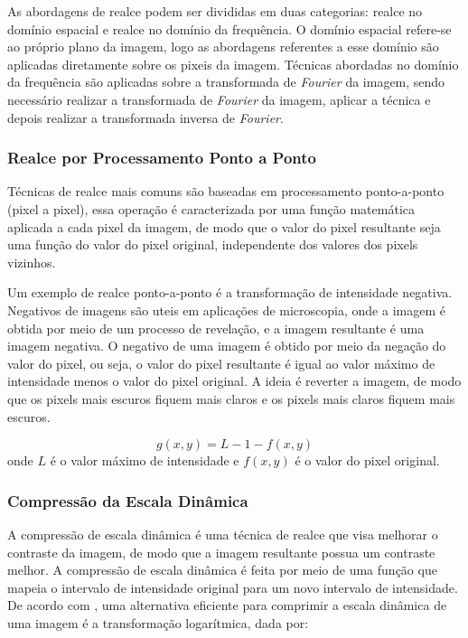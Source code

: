 \documentclass[conference]{IEEEtran}
\begin{document}
As abordagens de realce podem ser divididas em duas categorias: realce no domínio espacial e realce no domínio da 
frequência. O domínio espacial refere-se ao próprio plano da imagem, logo as abordagens referentes a esse domínio 
são aplicadas diretamente sobre os pixeis da imagem. Técnicas abordadas no domínio da frequência são aplicadas 
sobre a transformada de \emph{Fourier} da imagem, sendo necessário realizar a transformada de \emph{Fourier} da 
imagem, aplicar a técnica e depois realizar a transformada inversa de \emph{Fourier}. 

\subsubsection{Realce por Processamento Ponto a Ponto}

Técnicas de realce mais comuns são baseadas em processamento ponto-a-ponto (pixel a pixel), essa operação é 
caracterizada por uma função matemática aplicada a cada pixel da imagem, de modo que o valor do pixel resultante 
seja uma função do valor do pixel original, independente dos valores dos pixels vizinhos. 

Um exemplo de realce ponto-a-ponto é a transformação de intensidade negativa. Negativos de imagens são uteis em 
aplicações de microscopia, onde a imagem é obtida por meio de um processo de revelação, e a imagem resultante é 
uma imagem negativa. O negativo de uma imagem é obtido por meio da negação do valor do pixel, ou seja, o valor do 
pixel resultante é igual ao valor máximo de intensidade menos o valor do pixel original. 
A ideia é reverter a imagem, de modo que os pixels mais escuros fiquem mais claros e os pixels mais claros fiquem 
mais escuros.

\begin{equation}
g(x, y) = L - 1 - f(x, y)
\label{eq:neg_img}
\end{equation}
onde $L$ é o valor máximo de intensidade e $f(x,y)$ é o valor do pixel original.

\subsubsection{Compressão da Escala Dinâmica}

A compressão de escala dinâmica é uma técnica de realce que visa melhorar o contraste da imagem, 
de modo que a imagem resultante possua um contraste melhor. 
A compressão de escala dinâmica é feita por meio de uma função que mapeia o intervalo de intensidade original para 
um novo intervalo de intensidade. De acordo com \cite{gonzalez2000}, 
uma alternativa eficiente para comprimir a escala dinâmica de uma imagem é a transformação logarítmica, dada por:
\end{document}
